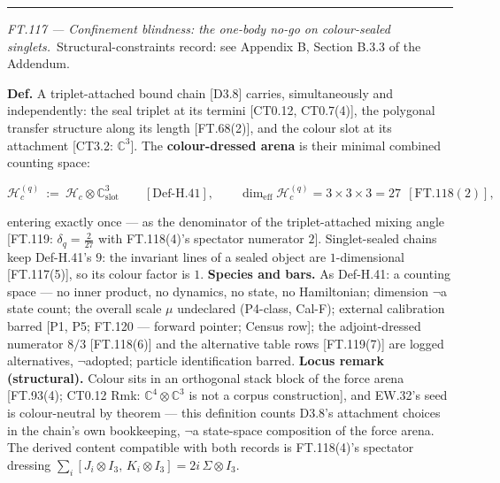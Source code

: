 \begin{theorem}
\vspace{2pt}\noindent\rule{\textwidth}{0.4pt}\vspace{2pt}

\end{theorem}

\medskip\noindent\textit{\texorpdfstring{FT.117 — Confinement blindness: the one-body no-go on colour-sealed singlets}{FT.117 - Confinement blindness: the one-body no-go on colour-sealed singlets}.}\ Structural-constraints record: see Appendix B, Section B.3.3 of the Addendum.\par\medskip

\begin{definition}\label{tag:Def-H-42}
\textbf{Def.} A triplet-attached bound chain [D3.8] carries, simultaneously and independently: the seal triplet at its termini [CT0.12, CT0.7(4)], the polygonal transfer structure along its length [FT.68(2)], and the colour slot at its attachment [CT3.2: $\mathbb C^3$]. The \textbf{colour-dressed arena} is their minimal combined counting space:

\[
\mathcal H_c^{(q)}\ :=\ \mathcal H_c\otimes\mathbb C^3_{\mathrm{slot}}\qquad[\mathrm{Def\text{-}H.41}],\qquad
\dim_{\mathrm{eff}}\mathcal H_c^{(q)}=3\times3\times3=27\ \ [\mathrm{FT.118}(2)],
\]

entering exactly once — as the denominator of the triplet-attached mixing angle [FT.119: $\delta_q=\tfrac2{27}$ with FT.118(4)'s spectator numerator $2$]. Singlet-sealed chains keep Def-H.41's $9$: the invariant lines of a sealed object are $1$-dimensional [FT.117(5)], so its colour factor is $1$. \textbf{Species and bars.} As Def-H.41: a counting space — no inner product, no dynamics, no state, no Hamiltonian; dimension $\neg$a state count; the overall scale $\mu$ undeclared (P4-class, Cal-F); external calibration barred [P1, P5; FT.120 — forward pointer; Census row]; the adjoint-dressed numerator $8/3$ [FT.118(6)] and the alternative table rows [FT.119(7)] are logged alternatives, $\neg$adopted; particle identification barred. \textbf{Locus remark (structural).} Colour sits in an orthogonal stack block of the force arena [FT.93(4); CT0.12 Rmk: $\mathbb C^4\otimes\mathbb C^3$ is not a corpus construction], and EW.32's seed is colour-neutral by theorem — this definition counts D3.8's attachment choices in the chain's own bookkeeping, $\neg$a state-space composition of the force arena. The derived content compatible with both records is FT.118(4)'s spectator dressing $\sum_i[J_i\otimes I_3,\,K_i\otimes I_3]=2i\,\Sigma\otimes I_3$.

\end{definition}

